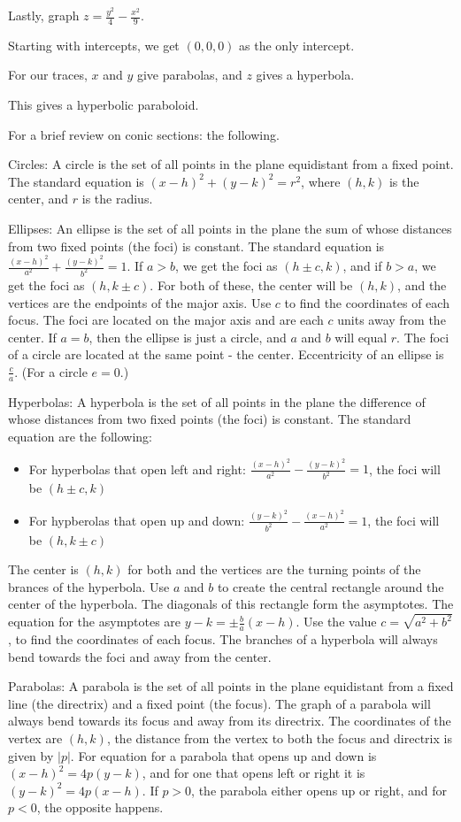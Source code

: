\documentclass[../calc3.tex]{subfiles}
\begin{document}
\begin{example}
    Lastly, graph $z=\frac{y^2}{4}-\frac{x^2}{9}$.

    Starting with intercepts, we get $(0,0,0)$ as the only intercept.

    For our traces, $x$ and $y$ give parabolas, and $z$ gives a hyperbola.

    This gives a hyperbolic paraboloid.
\end{example}

\pagebreak
For a brief review on conic sections: the following.

Circles: A circle is the set of all points in the plane equidistant from a fixed point. The standard equation is $(x-h)^2+(y-k)^2=r^2$, where $(h,k)$ is the center, and $r$ is the radius.

Ellipses: An ellipse is the set of all points in the plane the sum of whose distances from two fixed points (the foci) is constant. The standard equation is $\frac{(x-h)^2}{a^2}+\frac{(y-k)^2}{b^2}=1$. 
If $a>b$, we get the foci as $(h\pm c,k)$, and if $b>a$, we get the foci as $(h,k\pm c)$. For both of these, the center will be $(h,k)$, and the vertices are the endpoints of the major axis. Use $c$ to find the coordinates of each focus. The foci are located on the major axis and are each $c$ units away from the center.
If $a=b$, then the ellipse is just a circle, and $a$ and $b$ will equal $r$. The foci of a circle are located at the same point - the center. Eccentricity of an ellipse is $\frac{c}{a}$. (For a circle $e=0$.)

Hyperbolas: A hyperbola is the set of all points in the plane the difference of whose distances from two fixed points (the foci) is constant. The standard equation are the following:
\begin{itemize}
    \item For hyperbolas that open left and right: $\frac{(x-h)^2}{a^2}-\frac{(y-k)^2}{b^2}=1$, the foci will be $(h\pm c,k)$
    \item For hypberolas that open up and down: $\frac{(y-k)^2}{b^2}-\frac{(x-h)^2}{a^2}=1$, the foci will be $(h,k\pm c)$
\end{itemize}
The center is $(h,k)$ for both and the vertices are the turning points of the brances of the hyperbola. Use $a$ and $b$ to create the central rectangle around the center of the hyperbola. The diagonals of this rectangle form the asymptotes. 
The equation for the asymptotes are $y-k=\pm \frac{b}{a}(x-h)$. Use the value $c=\sqrt{a^2+b^2}$, to find the coordinates of each focus. The branches of a hyperbola will always bend towards the foci and away from the center.

Parabolas: A parabola is the set of all points in the plane equidistant from a fixed line (the directrix) and a fixed point (the focus).
The graph of a parabola will always bend towards its focus and away from its directrix. The coordinates of the vertex are $(h,k)$, the distance from the vertex to both the focus and directrix is given by $|p|$.
For equation for a parabola that opens up and down is $(x-h)^2=4p(y-k)$, and for one that opens left or right it is $(y-k)^2=4p(x-h)$. If $p>0$, the parabola either opens up or right, and for $p<0$, the opposite happens.
\end{document}
